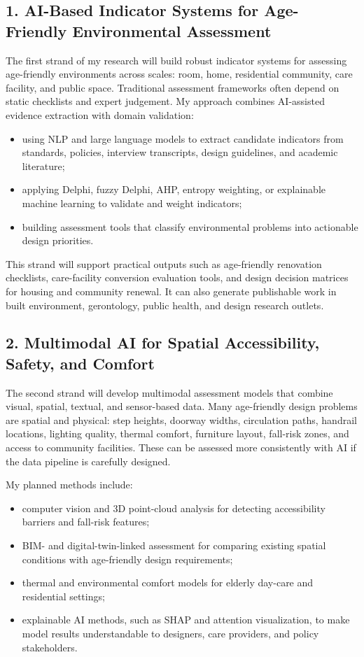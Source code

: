 \documentclass[11pt,a4paper]{article}
\begin{document}
\subsection*{1. AI-Based Indicator Systems for Age-Friendly Environmental Assessment}
The first strand of my research will build robust indicator systems for assessing age-friendly environments across scales: room, home, residential community, care facility, and public space. Traditional assessment frameworks often depend on static checklists and expert judgement. My approach combines AI-assisted evidence extraction with domain validation:
\begin{itemize}
  \item using NLP and large language models to extract candidate indicators from standards, policies, interview transcripts, design guidelines, and academic literature;
  \item applying Delphi, fuzzy Delphi, AHP, entropy weighting, or explainable machine learning to validate and weight indicators;
  \item building assessment tools that classify environmental problems into actionable design priorities.
\end{itemize}

This strand will support practical outputs such as age-friendly renovation checklists, care-facility conversion evaluation tools, and design decision matrices for housing and community renewal. It can also generate publishable work in built environment, gerontology, public health, and design research outlets.

\subsection*{2. Multimodal AI for Spatial Accessibility, Safety, and Comfort}
The second strand will develop multimodal assessment models that combine visual, spatial, textual, and sensor-based data. Many age-friendly design problems are spatial and physical: step heights, doorway widths, circulation paths, handrail locations, lighting quality, thermal comfort, furniture layout, fall-risk zones, and access to community facilities. These can be assessed more consistently with AI if the data pipeline is carefully designed.

My planned methods include:
\begin{itemize}
  \item computer vision and 3D point-cloud analysis for detecting accessibility barriers and fall-risk features;
  \item BIM- and digital-twin-linked assessment for comparing existing spatial conditions with age-friendly design requirements;
  \item thermal and environmental comfort models for elderly day-care and residential settings;
  \item explainable AI methods, such as SHAP and attention visualization, to make model results understandable to designers, care providers, and policy stakeholders.
\end{itemize}
\end{document}
